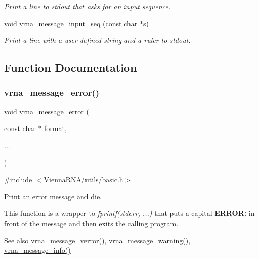\begin{DoxyCompactItemize}
\begin{DoxyCompactList}\small\item\em Print a line to {\itshape stdout} that asks for an input sequence. \end{DoxyCompactList}\item 
void \mbox{\hyperlink{group__message__utils_gaf4d194d558b0c975f269de01dea52460}{vrna\+\_\+message\+\_\+input\+\_\+seq}} (const char $\ast$s)
\begin{DoxyCompactList}\small\item\em Print a line with a user defined string and a ruler to stdout. \end{DoxyCompactList}\end{DoxyCompactItemize}


\subsection{Function Documentation}
\mbox{\label{group__message__utils_ga36b35be01d7f36cf7f59c245eee628d1}} 
\subsubsection{\texorpdfstring{vrna\_message\_error()}{vrna\_message\_error()}}
{\footnotesize\ttfamily void vrna\+\_\+message\+\_\+error (\begin{DoxyParamCaption}\item[{const char $\ast$}]{format,  }\item[{}]{... }\end{DoxyParamCaption})}



{\ttfamily \#include $<$\mbox{\hyperlink{utils_2basic_8h}{Vienna\+R\+N\+A/utils/basic.\+h}}$>$}



Print an error message and die. 

This function is a wrapper to {\itshape fprintf(stderr, ...)} that puts a capital {\bfseries{E\+R\+R\+OR\+:}} in front of the message and then exits the calling program.

\begin{DoxySeeAlso}{See also}
\mbox{\hyperlink{group__message__utils_gabc1a08dea0d84b5c33701732172a8b18}{vrna\+\_\+message\+\_\+verror()}}, \mbox{\hyperlink{group__message__utils_ga6e07ed24add60693ba886d54d0a46635}{vrna\+\_\+message\+\_\+warning()}}, \mbox{\hyperlink{group__message__utils_ga039bae6153a6415b054dbe6045f83d03}{vrna\+\_\+message\+\_\+info()}}
\end{DoxySeeAlso}

